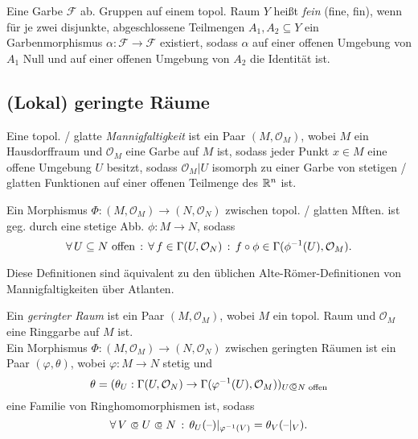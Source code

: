 \documentclass{cheat-sheet}
\newcommand{\Fais}{\mathcal{F}} %
\renewcommand{\O}{\mathcal{O}} %
\begin{document}
\begin{defn}
   Eine Garbe $\Fais$ ab. Gruppen auf einem topol. Raum $Y$ heißt \emph{fein} (fine, fin), wenn für je zwei disjunkte, abgeschlossene Teilmengen $A_1, A_2 \subseteq Y$ ein Garbenmorphismus $\alpha : \Fais \to \Fais$ existiert, sodass $\alpha$ auf einer offenen Umgebung von $A_1$ Null und auf einer offenen Umgebung von $A_2$ die Identität ist.
\end{defn}

\begin{samepage}
  \subsection{(Lokal) geringte Räume}
\end{samepage}


\begin{defn}
  Eine topol. / glatte \emph{Mannigfaltigkeit} ist ein Paar $(M, \O_M)$, wobei $M$ ein Hausdorffraum und $\O_M$ eine Garbe auf $M$ ist, sodass jeder Punkt $x \in M$ eine offene Umgebung $U$ besitzt, sodass $\O_M|U$ isomorph zu einer Garbe von stetigen / glatten Funktionen auf einer offenen Teilmenge des $\mathbb{R}^n$ ist.
\end{defn}

\begin{defn}
  Ein Morphismus $\Phi : (M, \O_M) \to (N, \O_N)$ zwischen topol. / glatten Mften. ist geg. durch eine stetige Abb. $\phi : M \to N$, sodass
  \[
    \fa{U \subseteq N \text{ offen}} \fa{f \in \Gamma(U, \O_N)} f \circ \phi \in \Gamma(\phi^{-1}(U), \O_M).
  \]
\end{defn}

\begin{bem}
  Diese Definitionen sind äquivalent zu den üblichen Alte-Römer-Definitionen von Mannigfaltigkeiten über Atlanten.
\end{bem}

\begin{defn}
  Ein \emph{geringter Raum} ist ein Paar $(M, \O_M)$, wobei $M$ ein topol. Raum und $\O_M$ eine Ringgarbe auf $M$ ist. \\
  Ein Morphismus $\Phi : (M, \O_M) \to (N, \O_N)$ zwischen geringten Räumen ist ein Paar $(\varphi, \theta)$, wobei $\varphi : M \to N$ stetig und
  \[ \theta = (\theta_U : \Gamma(U, \O_N) \to \Gamma(\varphi^{-1}(U), \O_M))_{U \opn N \text{ offen}} \]
  eine Familie von Ringhomomorphismen ist, sodass
  \[ \fa{V \opn U \opn N} \theta_U(\blank)|_{\varphi^{-1}(V)} = \theta_V(\blank|_V). \]
\end{defn}
\end{document}
